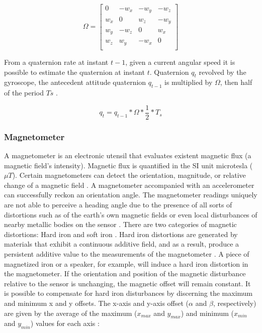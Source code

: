 \begin{equation}
    \Omega = \begin{bmatrix}
        0   & -w_x & -w_y & -w_z \\
        w_x & 0    & w_z  & -w_y \\
        w_y & -w_z & 0    & w_x  \\
        w_z & w_y  & -w_x & 0    \\
    \end{bmatrix}
\end{equation}

From a quaternion rate at instant $t-1$, given a current angular speed it is possible to estimate the quaternion at instant $t$. Quaternion $q_t$ revolved by the gyroscope, the antecedent attitude quaternion $q_{t-1}$ is multiplied by $\Omega$, then half of the period $Ts$ \cite{trusov2011overview}.

\begin{equation}
    q_t = q_{t-1} \ast \Omega \ast \frac{1}{2} \ast T_s
\end{equation}

\subsubsection{Magnetometer}

A magnetometer is an electronic utensil that evaluates existent magnetic flux (a magnetic field's intensity). Magnetic flux is quantified in the SI unit microtesla ($\mu T$). Certain magnetometers can detect the orientation, magnitude, or relative change of a magnetic field \cite{caruso1998new}. A magnetometer accompanied with an accelerometer can successfully reckon an orientation angle. The magnetometer readings uniquely are not able to perceive a heading angle due to the presence of all sorts of distortions such as of the earth's own magnetic fields or even local disturbances of nearby metallic bodies on the sensor \cite{silva2021error} \cite{caruso1998new}. There are two categories of magnetic distortions: Hard iron and soft iron \cite{wahdan2014magnetometer}. Hard iron distortions are generated by materials that exhibit a continuous additive field, and as a result, produce a persistent additive value to the measurements of the magnetometer \cite{guo2008soft}. A piece of magnetized iron or a speaker, for example, will induce a hard iron distortion in the magnetometer. If the orientation and position of the magnetic disturbance relative to the sensor is unchanging, the magnetic offset will remain constant. It is possible to compensate for hard iron disturbances by discerning the maximum and minimum x and y offsets. The x-axis and y-axis offset ($\alpha$ and $\beta$, respectively) are given by the average of the maximum ($x_{max}$ and $y_{max}$) and minimum ($x_{min}$ and $y_{min}$) values for each axis \cite{daponte2017method}:

